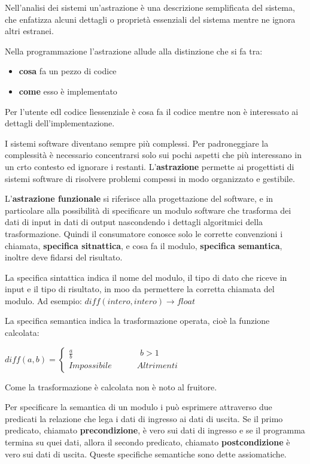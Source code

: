 \documentclass[a4paper,18pt]{extarticle}
\begin{document}
Nell'analisi dei sistemi un'astrazione è una descrizione semplificata del sistema, che enfatizza alcuni dettagli o proprietà essenziali del sistema mentre ne ignora altri estranei.

Nella programmazione l'astrazione allude alla distinzione che si fa tra:
\begin{itemize}
  \item \textbf{cosa} fa un pezzo di codice
  \item \textbf{come} esso è implementato
\end{itemize}
Per l'utente edl codice lìessenziale è cosa fa il codice mentre non è interessato ai dettagli dell'implementazione.

I sistemi software diventano sempre più complessi. Per padroneggiare la complessità è necessario concentrarsi solo sui pochi aspetti che più interessano in un crto contesto ed ignorare i restanti. L'\textbf{astrazione} permette ai progettisti di sistemi software di risolvere problemi compessi in modo organizzato e gestibile.

L'\textbf{astrazione funzionale} si riferisce alla progettazione del software, e in particolare alla possibilità di specificare un modulo software che trasforma dei dati di input in dati di output nascondendo i dettagli algoritmici della trasformazione. Quindi il consumatore conosce solo le corrette convenzioni i chiamata, \textbf{specifica sitnattica}, e cosa fa il modulo, \textbf{specifica semantica}, inoltre deve fidarsi del risultato.

La specifica sintattica indica il nome del modulo, il tipo di dato che riceve in input e il tipo di risultato, in moo da permettere la corretta chiamata del modulo. Ad esempio: $diff(intero, intero)\rightarrow float$

La specifica semantica indica la trasformazione operata, cioè la funzione calcolata:

$diff(a, b) = 
\begin{cases}  
\frac{a}{b} \quad\quad\quad\quad\quad\quad\quad\quad b>1\\
Impossibile   \quad \quad \quad Altrimenti

\end{cases}$

Come la trasformazione è calcolata non è noto al fruitore.


Per specificare la semantica di un modulo i può esprimere attraverso due predicati la relazione che lega i dati di ingresso ai dati di uscita. Se il primo predicato, chiamato \textbf{precondizione}, è vero sui dati di ingresso e se il programma termina su quei dati, allora il secondo predicato, chiamato \textbf{postcondizione} è vero sui dati di uscita. Queste specifiche semantiche sono dette assiomatiche.
\end{document}
